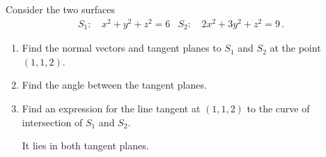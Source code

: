 \begin{question}
Consider the two surfaces
\begin{align*}
S_1:\,&x^2 + y^2 + z^2 = 6 &
S_2:\,&2x^2 + 3y^2 +z^2 = 9\,.
\end{align*}
\begin{enumerate}
\item
Find the normal vectors and tangent planes to $S_1$ and $S_2$ at the point $(1,1,2)$.
\item
Find the angle between the tangent planes.
\item
Find an expression for the line tangent at $(1,1,2)$ to the curve of intersection of $S_1$ and $S_2$.

\begin{hint*}
It lies in both tangent planes.
\end{hint*}
\end{enumerate}
\end{question}

